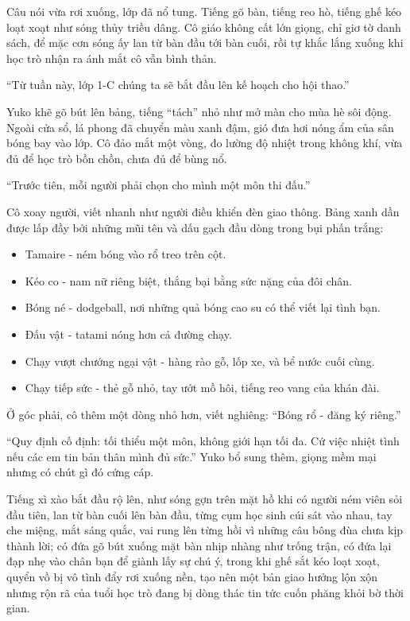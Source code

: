 \documentclass[../main.tex]{subfiles}
\begin{document}
Câu nói vừa rơi xuống, lớp đã nổ tung. Tiếng gõ bàn, tiếng reo hò, tiếng ghế kéo loạt xoạt như sóng thủy triều dâng. Cô giáo không cất lớn giọng, chỉ giơ tờ danh sách, để mặc cơn sóng ấy lan từ bàn đầu tới bàn cuối, rồi tự khắc lắng xuống khi học trò nhận ra ánh mắt cô vẫn bình thản.

``Từ tuần này, lớp 1-C chúng ta sẽ bắt đầu lên kế hoạch cho hội thao.''

Yuko khẽ gõ bút lên bảng, tiếng ``tách'' nhỏ như mở màn cho mùa hè sôi động. Ngoài cửa sổ, lá phong đã chuyển màu xanh đậm, gió đưa hơi nóng ẩm của sân bóng bay vào lớp. Cô đảo mắt một vòng, đo lường độ nhiệt trong không khí, vừa đủ để học trò bồn chồn, chưa đủ để bùng nổ.

``Trước tiên, mỗi người phải chọn cho mình một môn thi đấu.''

Cô xoay người, viết nhanh như người điều khiển đèn giao thông. Bảng xanh dần được lấp đầy bởi những mũi tên và dấu gạch đầu dòng trong bụi phấn trắng:

\begin{itemize}
  \item Tamaire - ném bóng vào rổ treo trên cột.
  \item Kéo co - nam nữ riêng biệt, thắng bại bằng sức nặng của đôi chân.
  \item Bóng né - dodgeball, nơi những quả bóng cao su có thể viết lại tình bạn.
  \item Đấu vật - tatami nóng hơn cả đường chạy.
  \item Chạy vượt chướng ngại vật - hàng rào gỗ, lốp xe, và bể nước cuối cùng.
  \item Chạy tiếp sức - thẻ gỗ nhỏ, tay ướt mồ hôi, tiếng reo vang của khán đài.
\end{itemize}

Ở góc phải, cô thêm một dòng nhỏ hơn, viết nghiêng: ``Bóng rổ - đăng ký riêng.''

``Quy định cố định: tối thiểu một môn, không giới hạn tối đa. Cứ việc nhiệt tình nếu các em tin bản thân mình đủ sức.'' Yuko bổ sung thêm, giọng mềm mại nhưng có chút gì đó cứng cáp.

Tiếng xì xào bắt đầu rộ lên, như sóng gợn trên mặt hồ khi có người ném viên sỏi đầu tiên, lan từ bàn cuối lên bàn đầu, từng cụm học sinh cúi sát vào nhau, tay che miệng, mắt sáng quắc, vai rung lên từng hồi vì những câu bông đùa chưa kịp thành lời; có đứa gõ bút xuống mặt bàn nhịp nhàng như trống trận, có đứa lại đạp nhẹ vào chân bạn để giành lấy sự chú ý, trong khi ghế sắt kéo loạt xoạt, quyển vồ bị vô tình đẩy rơi xuống nền, tạo nên một bản giao hưởng lộn xộn nhưng rộn rã của tuổi học trò đang bị dòng thác tin tức cuốn phăng khỏi bờ thời gian.
\end{document}
